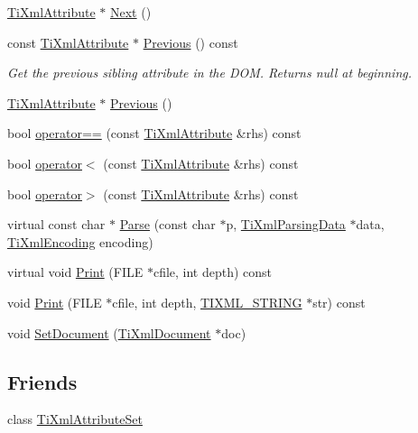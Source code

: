 \begin{DoxyCompactItemize}
\hyperlink{class_ti_xml_attribute}{Ti\+Xml\+Attribute} $\ast$ \hyperlink{class_ti_xml_attribute_a138320aa7793b148ba7e5bd0a0ea4db6}{Next} ()
\item 
const \hyperlink{class_ti_xml_attribute}{Ti\+Xml\+Attribute} $\ast$ \hyperlink{class_ti_xml_attribute_afc7bbfdf83d59fbc4ff5e283d27b5d7d}{Previous} () const
\begin{DoxyCompactList}\small\item\em Get the previous sibling attribute in the D\+OM. Returns null at beginning. \end{DoxyCompactList}\item 
\hyperlink{class_ti_xml_attribute}{Ti\+Xml\+Attribute} $\ast$ \hyperlink{class_ti_xml_attribute_ae4dabc932cba945ed1e92fec5f121193}{Previous} ()
\item 
bool \hyperlink{class_ti_xml_attribute_a51eef33c2cdd55831447af46be0baf8b}{operator==} (const \hyperlink{class_ti_xml_attribute}{Ti\+Xml\+Attribute} \&rhs) const
\item 
bool \hyperlink{class_ti_xml_attribute_a80dcb758cc5ab27ce9865301e2da1335}{operator$<$} (const \hyperlink{class_ti_xml_attribute}{Ti\+Xml\+Attribute} \&rhs) const
\item 
bool \hyperlink{class_ti_xml_attribute_a697c2dde7ac60fccaa7049cee906eb3e}{operator$>$} (const \hyperlink{class_ti_xml_attribute}{Ti\+Xml\+Attribute} \&rhs) const
\item 
virtual const char $\ast$ \hyperlink{class_ti_xml_attribute_ad62774421b814894b995af3b5d231dda}{Parse} (const char $\ast$p, \hyperlink{class_ti_xml_parsing_data}{Ti\+Xml\+Parsing\+Data} $\ast$data, \hyperlink{tinyxml_8h_a88d51847a13ee0f4b4d320d03d2c4d96}{Ti\+Xml\+Encoding} encoding)
\item 
virtual void \hyperlink{class_ti_xml_attribute_a68ae373e03b9c35be4c9d0c3c233b894}{Print} (F\+I\+LE $\ast$cfile, int depth) const
\item 
void \hyperlink{class_ti_xml_attribute_a5c8f72a7d1a49972434d45f4c2889e0e}{Print} (F\+I\+LE $\ast$cfile, int depth, \hyperlink{tinyxml_8h_a92bada05fd84d9a0c9a5bbe53de26887}{T\+I\+X\+M\+L\+\_\+\+S\+T\+R\+I\+NG} $\ast$str) const
\item 
void \hyperlink{class_ti_xml_attribute_ac12a94d4548302afb12f488ba101f7d1}{Set\+Document} (\hyperlink{class_ti_xml_document}{Ti\+Xml\+Document} $\ast$doc)
\end{DoxyCompactItemize}
\subsection*{Friends}
\begin{DoxyCompactItemize}
\item 
class \hyperlink{class_ti_xml_attribute_a35a7b7f89f708527677d5078d41ce0bf}{Ti\+Xml\+Attribute\+Set}
\end{DoxyCompactItemize}
